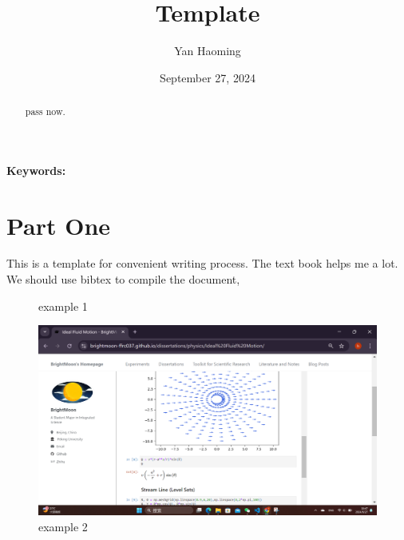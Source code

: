 \documentclass[UTF-8]{article}
\title{Template}
\author{Yan Haoming}
\date{September 27, 2024}
\begin{document}
\maketitle
\begin{abstract}
    pass now.
\end{abstract}
\textbf{Keywords: }
\section{Part One}
This is a template for convenient writing process.
The text book helps\cite{TheCell} me a lot.
We should use bibtex to compile the document,

 \begin{figure}
    \centering
    \caption{example 1}  
    \label{example 1}
 \end{figure}

\begin{figure}
    \centering
    \includegraphics[width=0.7\linewidth]{../Figures/example 3.png}
    \caption{example 2}
    \label{example 2}
\end{figure}
\end{document}
